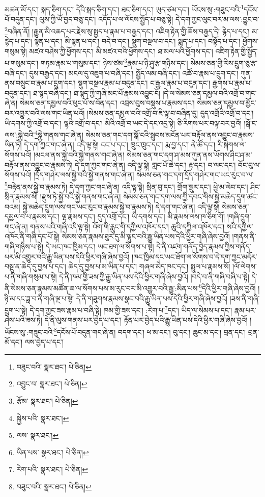 མཚན་མོ་དང་། སྐད་ཅིག་དང་། དེའི་སྐད་ཅིག་དང་། ཐང་ཅིག་དང་། ཡུད་ཙམ་དང་། ཡོངས་སུ་:གཟུང་བའི་\footnote{བཟུང་བའི་  སྣར་ཐང་།  པེ་ཅིན། }དངོས་པོ་བདུན་དང་། ལུས་ཀྱི་ཡོ་བྱད་བཅུ་དང་། འདོད་པ་ལ་ལོངས་སྤྱོད་པ་བཅུ་སྟེ། དེ་དག་ཀྱང་ལུང་བར་མ་ལས་:བྱུང་བ་\footnote{འབྱུང་བ་  སྣར་ཐང་།  པེ་ཅིན། }བཞིན་ནོ། །རྒྱུན་མི་འཆད་པར་རྗེས་སུ་སྤྱད་པ་རྣམ་པ་བརྒྱད་དང་། འཇིག་རྟེན་གྱི་ཆོས་བརྒྱད་དེ། རྙེད་པ་དང་། མ་རྙེད་པ་དང་། སྙན་པ་དང་། མི་སྙན་པ་དང་། བདེ་བ་དང་། སྡུག་བསྔལ་བ་དང་། སྨད་པ་དང་། བསྟོད་པ་དང་། ཕྱོགས་གསུམ་སྟེ། མཛའ་བཤེས་ཀྱི་ཕྱོགས་དང་། མི་མཛའ་བའི་ཕྱོགས་དང་། ཐ་མལ་པའི་ཕྱོགས་དང་། འཇིག་རྟེན་གྱི་སྤྱོད་པ་གསུམ་དང་། གཏམ་རྣམ་པ་གསུམ་དང་། ཉེས་ཙམ་\footnote{རྩོམ་  སྣར་ཐང་།  པེ་ཅིན། }རྣམ་པ་ཉི་ཤུ་རྩ་གཉིས་དང་། སེམས་ཅན་གྱི་རིས་དྲུག་ཅུ་རྩ་བཞི་དང་། དུས་བརྒྱད་དང་། མངལ་དུ་འཇུག་པ་བཞི་དང་། སྤྱོད་ལམ་བཞི་དང་། འཚོ་བ་རྣམ་པ་དྲུག་དང་། ཀུན་ནས་བསྲུང་བ་རྣམ་པ་དྲུག་དང་། སྡུག་བསྔལ་རྣམ་པ་བདུན་དང་། ང་རྒྱལ་རྣམ་པ་བདུན་དང་། རྒྱགས་པ་རྣམ་པ་བདུན་དང་། ཐ་སྙད་བཞི་དང་། ཐ་སྙད་ཀྱི་གཞི་མང་པོ་རྣམས་འབྱུང་ངོ། །དེ་ལ་སེམས་ཅན་དམྱལ་བའི་འགྲོ་བ་གང་ཞེ་ན། སེམས་ཅན་དམྱལ་བའི་ཕུང་པོ་ས་བོན་དང་། འབྲས་བུས་བསྡུས་པ་རྣམས་དང་། སེམས་ཅན་དམྱལ་བ་མྱོང་བར་འགྱུར་བའི་ལས་གང་ཡིན་པའོ། །སེམས་ཅན་དམྱལ་བའི་འགྲོ་བ་ཇི་ལྟ་བ་བཞིན་དུ། དུད་འགྲོའི་འགྲོ་བ་དང་། ཡི་དགས་ཀྱི་འགྲོ་བ་དང་། ལྷའི་འགྲོ་བ་དང་། མིའི་འགྲོ་བ་ཡང་དེ་དང་འདྲ་སྟེ། ཅི་རིགས་པར་བལྟ་བར་བྱའོ། །སྒོ་ང་ལས་:སྐྱེ་བའི་\footnote{སྐྱེས་པའི་  སྣར་ཐང་། }སྐྱེ་གནས་གང་ཞེ་ན། སེམས་ཅན་གང་དག་སྒོ་ངའི་སྦུབས་མངོན་པར་བརྟོལ་ནས་འབྱུང་བ་རྣམས་ཡིན་ཏེ། དེ་དག་ཀྱང་གང་ཞེ་ན། འདི་ལྟ་སྟེ། ངང་པ་དང་། ཁྲུང་ཁྲུང་དང་། རྨ་བྱ་དང་། ནེ་ཚོ་དང་། རི་སྐེགས་ལ་སོགས་པའོ། །མངལ་ནས་སྐྱེ་བའི་སྐྱེ་གནས་གང་ཞེ་ན། སེམས་ཅན་གང་དག་ཤ་མས་ཀུན་ནས་ཡོགས་ཤིང་ཤ་མ་བརྟོལ་ནས་འབྱུང་བ་རྣམས་ཏེ། དེ་དག་ཀྱང་གང་ཞེ་ན། འདི་ལྟ་སྟེ། གླང་པོ་ཆེ་དང་། རྟ་དང་། བ་ལང་དང་། བོང་བུ་ལ་སོགས་པའོ། །དྲོད་གཤེར་ལས་སྐྱེ་བའི་སྐྱེ་གནས་གང་ཞེ་ན། སེམས་ཅན་གང་དག་དྲོད་གཤེར་གང་ཡང་རུང་བ་ལ་\footnote{ལས་  སྣར་ཐང་། }བརྟེན་ནས་སྐྱེ་བ་རྣམས་ཏེ། དེ་དག་ཀྱང་གང་ཞེ་ན། འདི་ལྟ་སྟེ། སྲིན་བུ་དང་། གྲོག་སྦུར་དང་། ཕྱེ་མ་ལེབ་དང་། ཤིང་སྲིན་རྣམས་སོ། །རྫུས་ཏེ་སྐྱེ་བའི་སྐྱེ་གནས་གང་ཞེ་ན། སེམས་ཅན་གང་དག་ལས་ཀྱི་དབང་གིས་སྐྱེ་མཆེད་དྲུག་ཚང་བའམ། སྐྱེ་མཆེད་དྲུག་ལས་གང་ཡང་རུང་བ་རྣམས་སྐྱེ་བ་རྣམས་ཏེ། དེ་དག་གང་ཞེ་ན། འདི་ལྟ་སྟེ། སེམས་ཅན་དམྱལ་བ་པ་རྣམས་དང་། ལྷ་རྣམས་དང་། དུད་འགྲོ་དང་། ཡི་དགས་དང་། མི་རྣམས་ལས་ཁ་ཅིག་གོ། །གཞི་དྲུག་གང་ཞེ་ན། གནས་པའི་གཞི་འདི་ལྟ་སྟེ། འོག་གི་རླུང་གི་དཀྱིལ་འཁོར་དང་། ཆུའི་དཀྱིལ་འཁོར་དང་། སའི་དཀྱིལ་འཁོར་ནི་གཞི་དང་པོ་སྟེ། སེམས་ཅན་རྣམས་ཐུར་དུ་མི་ལྟུང་བའི་རྒྱུ་ཡིན་པས་དེའི་ཕྱིར་གཞི་ཞེས་བྱའོ། །གནས་ནི་གཞི་གཉིས་པ་སྟེ། དེ་ཡང་ཁང་ཁྱིམ་དང་། ཡང་ཐག་ལ་སོགས་པ་སྟེ། དེ་ནི་འཛག་གནོད་བྱེད་རྣམས་ཀྱིས་གནོད་པར་མི་འགྱུར་བའི་རྒྱུ་ཡིན་པས་དེའི་ཕྱིར་གཞི་ཞེས་བྱའོ། །ཁང་ཁྱིམ་དང་ཡང་ཐོག་ལ་སོགས་བ་དེ་དག་ཀྱང་མདོར་བསྡུ་ན་ཆེད་དུ་བྱས་པ་དང་། ཆེད་དུ་བྱས་པ་མ་ཡིན་པ་དང་། གཞལ་མེད་ཁང་དང་། སྤྲུལ་པ་རྣམས་སོ། །ལོ་ལེགས་པ་ནི་གཞི་གསུམ་པ་སྟེ། དེ་ནི་ཁམ་གྱི་ཟས་ཀྱི་རྒྱུ་ཡིན་པས་དེའི་ཕྱིར་གཞི་ཞེས་བྱའོ། །བདེ་བ་ནི་གཞི་བཞི་པ་སྟེ། དེ་ནི་སེམས་ཅན་རྣམས་མཚོན་ཆ་ལ་སོགས་པས་མ་རུང་བར་མི་འགྱུར་བའི་རྒྱུ་:མིན་པས་\footnote{ཡིན་པས་  སྣར་ཐང་།  པེ་ཅིན། }དེའི་ཕྱིར་གཞི་ཞེས་བྱའོ། །ཉི་མ་དང་ཟླ་བ་ནི་གཞི་ལྔ་པ་སྟེ། དེ་ནི་གཟུགས་རྣམས་སྣང་བའི་རྒྱུ་ཡིན་པས་དེའི་ཕྱིར་གཞི་ཞེས་བྱའོ། །ཟས་ནི་གཞི་དྲུག་པ་སྟེ། དེ་དག་ཀྱང་ཟས་རྣམ་པ་བཞི་སྟེ། ཁམ་གྱི་ཟས་དང་། :རེག་པ་\footnote{རེག་པའི་  སྣར་ཐང་།  པེ་ཅིན། }དང་། ཡིད་ལ་སེམས་པ་དང་། རྣམ་པར་ཤེས་པའི་ཟས་ཏེ། དེ་ནི་ལུས་གནས་པར་བྱེད་པ་དང་། རྟོན་པར་བྱེད་པའི་རྒྱུ་ཡིན་པས་དེའི་ཕྱིར་གཞི་ཞེས་བྱའོ། །ཡོངས་སུ་:གཟུང་བའི་\footnote{བཟུང་བའི་  སྣར་ཐང་།  པེ་ཅིན། }དངོས་པོ་བདུན་གང་ཞེ་ན། བདག་དང་། ཕ་མ་དང་། བུ་དང་། ཆུང་མ་དང་། བྲན་དང་། བྲན་མོ་དང་། ལས་བྱེད་པ་དང་། 